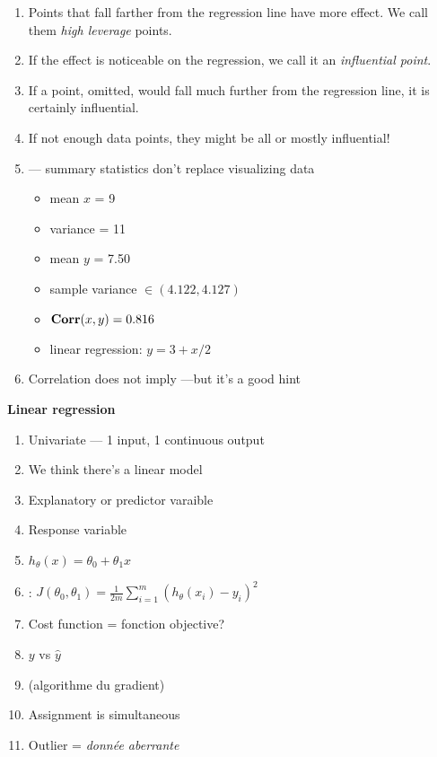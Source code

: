 \begin{enumerate}
\item Points that fall farther from the regression line have more
  effect.  We call them \textit{high leverage} points.
\item If the effect is noticeable on the regression, we call it an
  \textit{influential point}.
\item If a point, omitted, would fall much further from the regression
  line, it is certainly influential.
\item If not enough data points, they might be all or mostly
  influential!
\item {} --- summary statistics don't replace visualizing data
  \begin{itemize}
  \item mean $x$ = 9
  \item variance = 11
  \item mean $y$ = 7.50
  \item sample variance $\in (4.122, 4.127)$
  \item $\mathbf{Corr}(x,y) = 0.816$
  \item linear regression: $y=3 + x/2$
  \end{itemize}
\item Correlation does not imply ---but it's a good hint
\end{enumerate}

\textbf{Linear regression}
\begin{enumerate}
\item Univariate --- 1 input, 1 continuous output
\item We think there's a linear model
\item Explanatory or predictor varaible
\item Response variable
\item $h_\theta(x) = \theta_0 + \theta_1 x$
\item {} : $J(\theta_0, \theta_1) = \frac{1}{2m} \sum_{i=1}^m (h_\theta(x_i) - y_i)^2$
\item Cost function = fonction objective?
\item $y$ vs $\hat{y}$
\item {} (algorithme du gradient)
\item Assignment is simultaneous
\item Outlier = \textit{donnée aberrante}
\end{enumerate}


